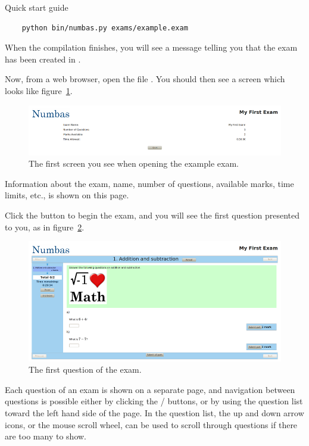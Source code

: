 \begin{chapter}{\label{cha:quickstart}Quick start guide}
  \begin{Verbatim}
    python bin/numbas.py exams/example.exam
  \end{Verbatim}
  When the compilation finishes, you will see a message telling you that the
  exam has been created in .

  Now, from a web browser, open the file .
  You should then see a screen which looks like
  figure~\ref{fig:example_screen1}.
  \begin{figure}[ht]
    \centering
    \includegraphics[scale=0.5]{fig/example_screen1}
    \caption{\label{fig:example_screen1}
      The first screen you see when opening the example exam.
    }
  \end{figure}
  Information about the exam, \eg name, number of questions, available marks,
  time limits, etc., is shown on this page.
  
  Click the  button to begin the exam, and you will see the
  first question presented to you, as in figure~\ref{fig:example_screen2}.
  \begin{figure}[ht]
    \centering
    \includegraphics[scale=0.5]{fig/example_screen2}
    \caption{\label{fig:example_screen2}
      The first question of the exam.
    }
  \end{figure}
  Each question of an exam is shown on a separate page, and navigation between
  questions is possible either by clicking the
  / buttons, or by using the question
  list toward the left hand side of the page.  In the question list, the up and
  down arrow icons, or the mouse scroll wheel, can be used to scroll through
  questions if there are too many to show.


\end{chapter}
